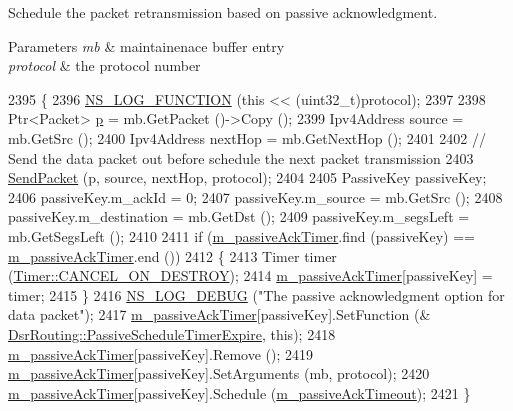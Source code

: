 Schedule the packet retransmission based on passive acknowledgment. 


\begin{DoxyParams}{Parameters}
{\em mb} & maintainenace buffer entry \\
\hline
{\em protocol} & the protocol number \\
\hline
\end{DoxyParams}

\begin{DoxyCode}
2395 \{
2396   \hyperlink{log-macros-disabled_8h_a90b90d5bad1f39cb1b64923ea94c0761}{NS\_LOG\_FUNCTION} (\textcolor{keyword}{this} << (uint32\_t)protocol);
2397 
2398   Ptr<Packet> \hyperlink{lte__link__budget_8m_ac9de518908a968428863f829398a4e62}{p} = mb.GetPacket ()->Copy ();
2399   Ipv4Address source = mb.GetSrc ();
2400   Ipv4Address nextHop = mb.GetNextHop ();
2401 
2402   \textcolor{comment}{// Send the data packet out before schedule the next packet transmission}
2403   \hyperlink{classns3_1_1dsr_1_1DsrRouting_a84a2caf24a41eef8993b64cb22874f95}{SendPacket} (p, source, nextHop, protocol);
2404 
2405   PassiveKey passiveKey;
2406   passiveKey.m\_ackId = 0;
2407   passiveKey.m\_source = mb.GetSrc ();
2408   passiveKey.m\_destination = mb.GetDst ();
2409   passiveKey.m\_segsLeft = mb.GetSegsLeft ();
2410 
2411   \textcolor{keywordflow}{if} (\hyperlink{classns3_1_1dsr_1_1DsrRouting_ac53c706898e76a7f4871a460d13edd36}{m\_passiveAckTimer}.find (passiveKey) == \hyperlink{classns3_1_1dsr_1_1DsrRouting_ac53c706898e76a7f4871a460d13edd36}{m\_passiveAckTimer}.end ())
2412     \{
2413       Timer timer (\hyperlink{classns3_1_1Timer_a816309b83cd2a35bea47d9bbc6bbf721a07a9dd5063b32fb6cf1f813c6ee7e28e}{Timer::CANCEL\_ON\_DESTROY});
2414       \hyperlink{classns3_1_1dsr_1_1DsrRouting_ac53c706898e76a7f4871a460d13edd36}{m\_passiveAckTimer}[passiveKey] = timer;
2415     \}
2416   \hyperlink{group__logging_ga413f1886406d49f59a6a0a89b77b4d0a}{NS\_LOG\_DEBUG} (\textcolor{stringliteral}{"The passive acknowledgment option for data packet"});
2417   \hyperlink{classns3_1_1dsr_1_1DsrRouting_ac53c706898e76a7f4871a460d13edd36}{m\_passiveAckTimer}[passiveKey].SetFunction (&
      \hyperlink{classns3_1_1dsr_1_1DsrRouting_a2f93ffc379338703d6b6a923dff44dd5}{DsrRouting::PassiveScheduleTimerExpire}, \textcolor{keyword}{this});
2418   \hyperlink{classns3_1_1dsr_1_1DsrRouting_ac53c706898e76a7f4871a460d13edd36}{m\_passiveAckTimer}[passiveKey].Remove ();
2419   \hyperlink{classns3_1_1dsr_1_1DsrRouting_ac53c706898e76a7f4871a460d13edd36}{m\_passiveAckTimer}[passiveKey].SetArguments (mb, protocol);
2420   \hyperlink{classns3_1_1dsr_1_1DsrRouting_ac53c706898e76a7f4871a460d13edd36}{m\_passiveAckTimer}[passiveKey].Schedule (\hyperlink{classns3_1_1dsr_1_1DsrRouting_a6155bddae63f0e1fda8afbeebc25a54c}{m\_passiveAckTimeout});
2421 \}
\end{DoxyCode}


